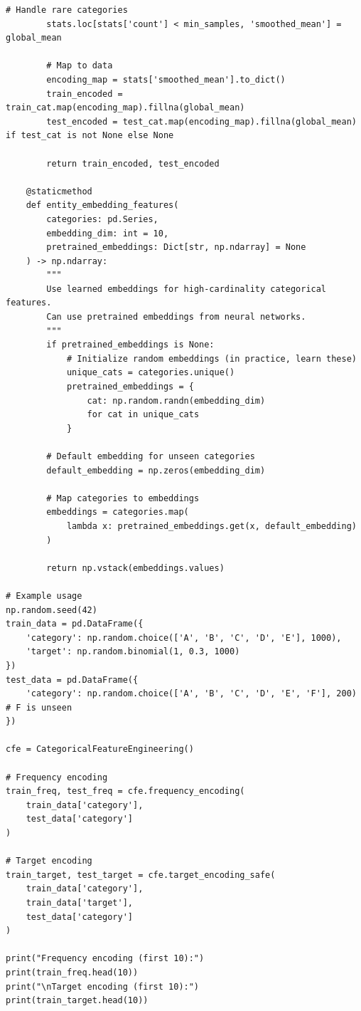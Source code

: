 \begin{lstlisting}[style=python, caption=Production-ready categorical feature encoding]
        # Handle rare categories
        stats.loc[stats['count'] < min_samples, 'smoothed_mean'] = global_mean

        # Map to data
        encoding_map = stats['smoothed_mean'].to_dict()
        train_encoded = train_cat.map(encoding_map).fillna(global_mean)
        test_encoded = test_cat.map(encoding_map).fillna(global_mean) if test_cat is not None else None

        return train_encoded, test_encoded

    @staticmethod
    def entity_embedding_features(
        categories: pd.Series,
        embedding_dim: int = 10,
        pretrained_embeddings: Dict[str, np.ndarray] = None
    ) -> np.ndarray:
        """
        Use learned embeddings for high-cardinality categorical features.
        Can use pretrained embeddings from neural networks.
        """
        if pretrained_embeddings is None:
            # Initialize random embeddings (in practice, learn these)
            unique_cats = categories.unique()
            pretrained_embeddings = {
                cat: np.random.randn(embedding_dim)
                for cat in unique_cats
            }

        # Default embedding for unseen categories
        default_embedding = np.zeros(embedding_dim)

        # Map categories to embeddings
        embeddings = categories.map(
            lambda x: pretrained_embeddings.get(x, default_embedding)
        )

        return np.vstack(embeddings.values)

# Example usage
np.random.seed(42)
train_data = pd.DataFrame({
    'category': np.random.choice(['A', 'B', 'C', 'D', 'E'], 1000),
    'target': np.random.binomial(1, 0.3, 1000)
})
test_data = pd.DataFrame({
    'category': np.random.choice(['A', 'B', 'C', 'D', 'E', 'F'], 200)  # F is unseen
})

cfe = CategoricalFeatureEngineering()

# Frequency encoding
train_freq, test_freq = cfe.frequency_encoding(
    train_data['category'],
    test_data['category']
)

# Target encoding
train_target, test_target = cfe.target_encoding_safe(
    train_data['category'],
    train_data['target'],
    test_data['category']
)

print("Frequency encoding (first 10):")
print(train_freq.head(10))
print("\nTarget encoding (first 10):")
print(train_target.head(10))
\end{lstlisting}

